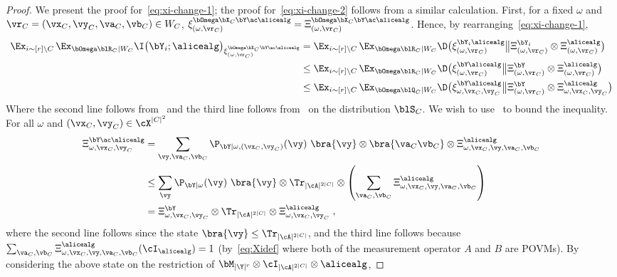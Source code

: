 \begin{proof}
	We present the proof for~\eqref{eq:xi-change-1}; the proof for~\eqref{eq:xi-change-2} follows from a similar calculation. First, for a fixed $\omega$ and $\vr_C = (\vx_C, \vy_C, \va_C, \vb_C) \in W_C$,  $\xi^{\bOmega \bX_C \bY \ac \alicealg}_{(\omega, \vr_C)} = \Xi^{\bOmega \bX_C \bY \ac \alicealg}_{(\omega, \vr_C)}$. Hence, by rearranging~\eqref{eq:xi-change-1},
	\begin{align}
		\Ex_{i \sim [r] \setminus C} \,  \Ex_{\bOmega \blR_C| W_C} \I \big (\bY_i ; \alicealg \big )_{\xi^{\bOmega \bX_C \bY \ac \alicealg}_{(\omega, \vr_C)}} &= \Ex_{i \sim [r] \setminus C} \,  \Ex_{\bOmega \blR_C| W_C} \D \big (\xi^{\bY_i \alicealg}_{(\omega, \vr_C)} \big \| \Xi_{(\omega, \vr_C)} ^{\bY_i} \otimes \Xi_{(\omega, \vr_C)} ^{\alicealg} \big )\notag\\
		\notag &\leq \Ex_{i \sim [r] \setminus C} \,  \Ex_{\bOmega \blR_C| W_C} \D \big (\xi^{\bY \alicealg}_{(\omega, \vr_C)} \big \| \Xi_{(\omega, \vr_C)} ^{\bY} \otimes \Xi_{(\omega, \vr_C)} ^{\alicealg} \big ) \\
		\label{eq:claim1a} &\leq \Ex_{i \sim [r] \setminus C} \,  \Ex_{\bOmega \blQ_C| W_C} \D \big (\xi^{\bY \alicealg}_{\omega, \vx_C, \vy_C} \big \| \Xi_{(\omega, \vr_C)} ^{\bY} \otimes \Xi_{\omega, \vx_C, \vy_C}^{\alicealg} \big ) 
	\end{align}
	Where the second line follows from~ and the third line follows from~ on the distribution $\blS_C$. We wish to use~ to bound the inequality. For all $\omega$ and $(\vx_C, \vy_C) \in \cX^{|C|^2}$
	\begin{align}
		\Xi^{\bY \ac \alicealg}_{\omega, \vx_C, \vy_C}  &= \sum_{\vy, \va_C, \vb_C} \P_{\bY | \omega, (\vx_C, \vy_C)}(\vy) \,\, \bra{\vy} \otimes \bra{\va_C \vb_C} \otimes \Xi_{\omega,\vx_C, \vy,\va_C,\vb_C}^{\alicealg}  \notag \\
		&\leq  \sum_{\vy} \P_{\bY | \omega}(\vy) \,\, \bra{\vy} \otimes \Tr_{|\cA|^{2|C|}} \otimes\left( \sum_{\va_C,\vb_C} \Xi_{\omega,\vx_C, \vy,\va_C,\vb_C}^{\alicealg} \right) \notag \\
		&= \Xi_{\omega , \vx_C, \vy_C}^{\bY} \otimes \Tr_{|\cA|^{2|C|}} \otimes \Xi^{\alicealg}_{\omega, \vx_C, \vy_C}   \;,\label{eq:claim3-2} 
	\end{align}
	where the second line follows since the state $\bra{\vy} \leq \Tr_{|\cA|^{2|C|}}$, and the third line follows because $\sum_{\va_C,\vb_C} \Xi_{\omega,\vx_C, \vy,\va_C,\vb_C}^{\alicealg}(\cI_{\alicealg}) = 1$ (by~\eqref{eq:Xidef} where both of the measurement operator $A$ and $B$ are POVMs). By considering the above state on the restriction of $\bM_{|\Y|^{r}} \otimes \cI_{|\cA|^{2|C|}} \otimes \alicealg$,

\end{proof}
